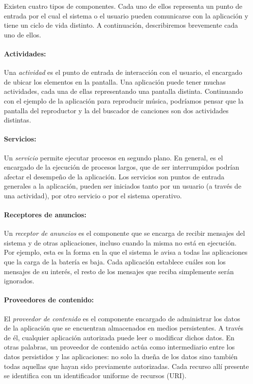 Existen cuatro tipos de componentes. Cada uno de ellos representa un punto de entrada por el cual el
sistema o el usuario pueden comunicarse con la aplicación y tiene un ciclo de vida distinto. A
continuación, describiremos brevemente cada uno de ellos.

\paragraph{Actividades:}
Una \textit{actividad} es el punto de entrada de interacción con el usuario, el encargado de ubicar
los elementos en la pantalla. Una aplicación puede tener muchas actividades, cada una de ellas
representando una pantalla distinta. Continuando con el ejemplo de la aplicación para reproducir
música, podríamos pensar que la pantalla del reproductor y la del buscador de canciones son dos
actividades distintas.

\paragraph{Servicios:}
Un \textit{servicio} permite ejecutar procesos en segundo plano. En general, es el encargado de la
ejecución de procesos largos, que de ser interrumpidos podrían afectar el desempeño de la
aplicación. Los servicios son puntos de entrada generales a la aplicación, pueden ser iniciados
tanto por un usuario (a través de una actividad), por otro servicio o por el sistema operativo.

\paragraph{Receptores de anuncios: }
Un \textit{receptor de anuncios} es el componente que se encarga de recibir mensajes del sistema y
de otras aplicaciones, incluso cuando la misma no está en ejecución. Por ejemplo, esta es la forma
en la que el sistema le avisa a todas las aplicaciones que la carga de la batería es baja. Cada
aplicación establece cuáles son los mensajes de su interés, el resto de los mensajes que reciba
simplemente serán ignorados.

\paragraph{Proveedores de contenido:}
El \textit{proveedor de contenido} es el componente encargado de administrar los datos de la
aplicación que se encuentran almacenados en medios persistentes. A través de él, cualquier
aplicación autorizada puede leer o modificar dichos datos. En otras palabras, un proveedor de
contenido actúa como intermediario entre los datos persistidos y las aplicaciones: no solo la dueña
de los datos sino también todas aquellas que hayan sido previamente autorizadas. Cada recurso allí
presente se identifica con un identificador uniforme de recursos (URI).

